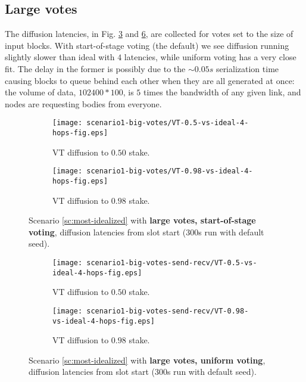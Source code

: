 \documentclass[11pt,a4paper]{article}
\begin{document}
\subsection{Large votes}
The diffusion latencies, in Fig. \ref{fig:scenario1-big-votes} and
\ref{fig:scenario1-big-votes-send-recv}, are collected for votes set to the size
of input blocks. With start-of-stage voting (the default) we see diffusion running
slightly slower than ideal with $4$ latencies, while uniform voting has a very
close fit. The delay in the former is possibly due to the $\sim 0.05s$
serialization time causing blocks to queue behind each other when they are all
generated at once: the volume of data, $102400*100$, is $5$ times the bandwidth
of any given link, and nodes are requesting bodies from everyone.

\begin{figure}[htbp]
    \centering
    \begin{subfigure}[b]{0.45\textwidth}
        \centering
        \texttt{[image: scenario1-big-votes/VT-0.5-vs-ideal-4-hops-fig.eps]}
        \caption{VT diffusion to $0.50$ stake.}
        \label{scenario1-big-votes:vt0.5}
    \end{subfigure}
    \hfill
    \begin{subfigure}[b]{0.45\textwidth}
        \centering
        \texttt{[image: scenario1-big-votes/VT-0.98-vs-ideal-4-hops-fig.eps]}
        \caption{VT diffusion to $0.98$ stake.}
        \label{scenario1-big-votes:vt0.98}
    \end{subfigure}
    \caption{Scenario \ref{sc:most-idealized} with \textbf{large votes, start-of-stage voting}, diffusion latencies from slot start (300s run with default seed).}
    \label{fig:scenario1-big-votes}
\end{figure}
\begin{figure}[htbp]
    \centering
    \begin{subfigure}[b]{0.45\textwidth}
        \centering
        \texttt{[image: scenario1-big-votes-send-recv/VT-0.5-vs-ideal-4-hops-fig.eps]}
        \caption{VT diffusion to $0.50$ stake.}
        \label{scenario1-big-votes-send-recv:vt0.5}
    \end{subfigure}
    \hfill
    \begin{subfigure}[b]{0.45\textwidth}
        \centering
        \texttt{[image: scenario1-big-votes-send-recv/VT-0.98-vs-ideal-4-hops-fig.eps]}
        \caption{VT diffusion to $0.98$ stake.}
        \label{scenario1-big-votes-send-recv:vt0.98}
    \end{subfigure}
    \caption{Scenario \ref{sc:most-idealized} with \textbf{large votes, uniform voting}, diffusion latencies from slot start (300s run with default seed).}
    \label{fig:scenario1-big-votes-send-recv}
\end{figure}
\end{document}
